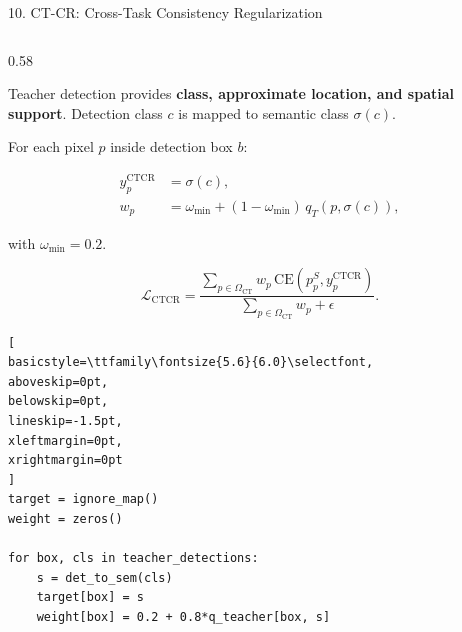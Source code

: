 \documentclass[aspectratio=169,11pt]{beamer}
\begin{document}
\begin{frame}[fragile]{10. CT-CR: Cross-Task Consistency Regularization}

\fontsize{7.2}{7.8}\selectfont

\setlength{\abovedisplayskip}{1.5pt}
\setlength{\belowdisplayskip}{1.5pt}
\setlength{\abovedisplayshortskip}{1pt}
\setlength{\belowdisplayshortskip}{1pt}
\setlength{\jot}{1pt}

\vspace{-0.15cm}

\begin{columns}[T,onlytextwidth]

\begin{column}{0.58\textwidth}

Teacher detection provides \textbf{class, approximate location,
and spatial support}. Detection class $c$ is mapped to semantic class
$\sigma(c)$.

\vspace{-0.02cm}

For each pixel $p$ inside detection box $b$:

\vspace{-0.08cm}

\[
\begin{aligned}
y^{\mathrm{CTCR}}_p &= \sigma(c),\\[-1mm]
w_p &= \omega_{\min}
      +(1-\omega_{\min})\,q_T(p,\sigma(c)),
\end{aligned}
\]

\vspace{-0.08cm}

with $\omega_{\min}=0.2$.

\vspace{-0.12cm}

\[
\mathcal{L}_{\mathrm{CTCR}}
=
\frac{
\sum_{p\in\Omega_{\mathrm{CT}}}
w_p\,
\mathrm{CE}
\!\left(
p^S_p,
y^{\mathrm{CTCR}}_p
\right)
}{
\sum_{p\in\Omega_{\mathrm{CT}}}w_p+\epsilon
}.
\]


\begin{lstlisting}[
basicstyle=\ttfamily\fontsize{5.6}{6.0}\selectfont,
aboveskip=0pt,
belowskip=0pt,
lineskip=-1.5pt,
xleftmargin=0pt,
xrightmargin=0pt
]
target = ignore_map()
weight = zeros()

for box, cls in teacher_detections:
    s = det_to_sem(cls)
    target[box] = s
    weight[box] = 0.2 + 0.8*q_teacher[box, s]


\end{lstlisting}
\end{column}
\end{columns}
\end{frame}
\end{document}
